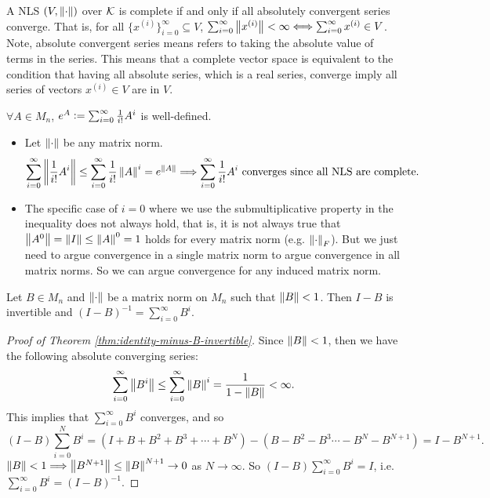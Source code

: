 \begin{theorem}
\label{thm:complete-absolute-convergent}
A NLS $(V,\left\lVert\cdot\right\rVert)$ over $\mathcal{K}$ is complete if and only if all absolutely convergent series converge. That is, for all $\{x^{(i)}\}_{i=0}^\infty \subseteq V$, $\sum_{i=0}^\infty\left\lVert x^{(i)}\right\rVert < \infty \Longleftrightarrow \sum_{i=0}^{\infty} x^{(i)} \in V$. Note, absolute convergent series means refers to taking the absolute value of terms in the series. This means that a complete vector space is equivalent to the condition that having all absolute series, which is a real series, converge imply all series of vectors $x^{(i)} \in V$ are in $V$.
\end{theorem}
\begin{definition}
\label{def:matrix-exponential}
$\forall A \in M_n$, $e^A \vcentcolon= \sum_{i=0}^\infty \frac{1}{i!}A^i$ is well-defined.
\begin{itemize}
    \item Let $\left\lVert\cdot\right\rVert$ be any matrix norm.
    \[
        \sum_{i=0}^\infty \left\lVert\frac{1}{i!}A^i\right\rVert \le \sum_{i=0}^\infty \frac{1}{i!}\left\lVert A\right\rVert^i = e^{\left\lVert A\right\rVert} \Longrightarrow \sum_{i=0}^\infty \frac{1}{i!}A^i \text{ converges since all NLS are complete}.
    \]
    \item The specific case of $i=0$ where we use the submultiplicative property in the inequality does not always hold, that is, it is not always true that $\left\lVert A^0\right\rVert = \left\lVert I\right\rVert \le \left\lVert A\right\rVert^0 = 1$ holds for every matrix norm (e.g. $\left\lVert\cdot\right\rVert_F$). But we just need to argue convergence in a single matrix norm to argue convergence in all matrix norms. So we can argue convergence for any induced matrix norm.
\end{itemize}
\end{definition}

\begin{theorem}
\label{thm:identity-minus-B-invertible}
Let $B \in M_n$ and $\left\lVert\cdot\right\rVert$ be a matrix norm on $M_n$ such that $\left\lVert B\right\rVert < 1$. Then $I-B$ is invertible and $(I-B)^{-1} = \sum_{i=0}^\infty B^i$.
\end{theorem}
\begin{proof}[Proof of Theorem \ref{thm:identity-minus-B-invertible}]
Since $\left\lVert B\right\rVert < 1$, then we have the following absolute converging series:
\[
\sum_{i=0}^\infty \left\lVert B^i\right\rVert \le \sum_{i=0}^\infty \left\lVert B\right\rVert^i = \frac{1}{1-\left\lVert B\right\rVert} < \infty.
\]
This implies that $\sum_{i=0}^\infty B^i$ converges, and so
\[
(I-B) \sum_{i=0}^N B^i = \left(I + B + B^2 + B^3 + \cdots + B^N\right) - \left(B - B^2 - B^3 \cdots - B^N - B^{N+1}\right) = I-B^{N+1}.
\]
$\left\lVert B\right\rVert < 1 \Longrightarrow \left\lVert B^{N+1}\right\rVert \le \left\lVert B\right\rVert^{N+1} \rightarrow 0$ as $N\rightarrow\infty$. So $(I-B) \sum_{i=0}^\infty B^i = I$, i.e. $\sum_{i=0}^\infty B^i = (I-B)^{-1}$.
\end{proof}

